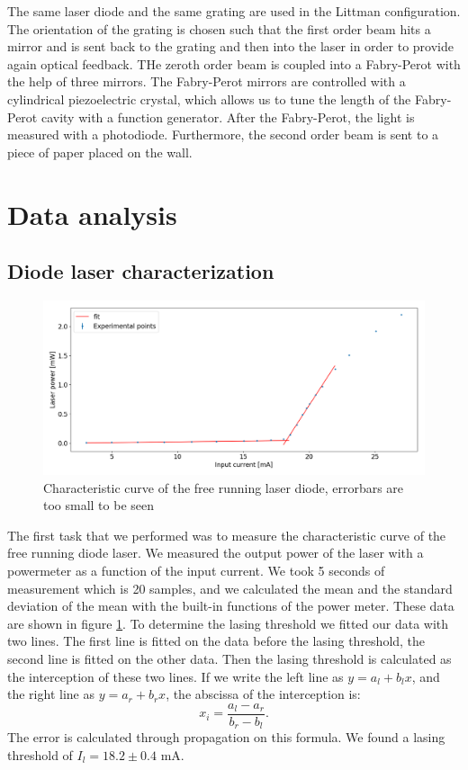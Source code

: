 \documentclass[a4paper,10pt]{article}
\begin{document}
The same laser diode and the same grating are used in the Littman configuration. The orientation of the grating is chosen such that the first order beam hits a mirror and is sent back to the grating and then into the laser in order to provide again optical feedback. THe zeroth order beam is coupled into a Fabry-Perot with the help of three mirrors. The Fabry-Perot mirrors are controlled with a cylindrical piezoelectric crystal, which allows us to tune the length of the Fabry-Perot cavity with a function generator. After the Fabry-Perot, the light is  measured with a photodiode. Furthermore, the second order beam is sent to a piece of paper placed on the wall.


\section{Data analysis}
\subsection{Diode laser characterization}
\begin{figure}[H]
\centering
\includegraphics[width=\textwidth]{curvefreerunning.png}
\caption{Characteristic curve of the free running laser diode, errorbars are too small to be seen}\label{curvefreerunning}
\end{figure}
The first task that we performed was to measure the characteristic curve of the free running diode laser. We measured the output power of the laser with a powermeter as a function of the input current. We took 5 seconds of measurement which is 20 samples, and we calculated the mean and the standard deviation of the mean with the built-in functions of the power meter. These data are shown in figure \ref{curvefreerunning}. To determine the lasing threshold we fitted our data with two lines. The first line is fitted on the data before the lasing threshold, the second line is fitted on the other data. Then the lasing threshold is calculated as the interception of these two lines. If we write the left line as $y=a_l + b_lx$, and the right line as $y = a_r +b_r x$, the abscissa of the interception is:
\[x_i = \frac{a_l-a_r}{b_r-b_l}.\]
The error is calculated through propagation on this formula. We found a lasing threshold of $I_l = 18.2\pm 0.4$ mA.
\end{document}
